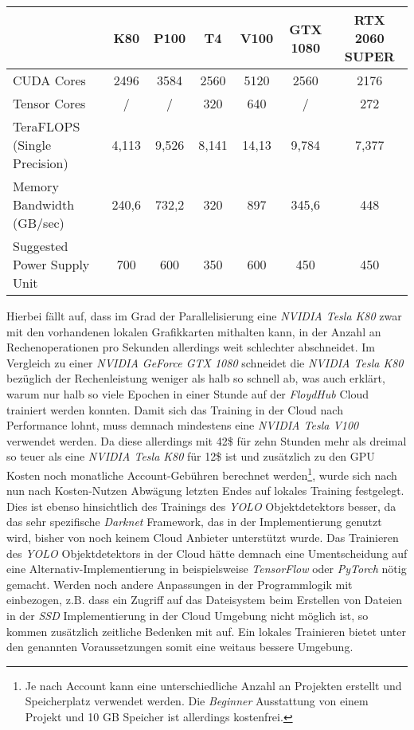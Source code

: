 \begin{center}
	\begin{tabular}[H]{l|c|c|c|c|c|c}
		& K80 & P100 & T4 & V100 & GTX 1080 & RTX 2060 SUPER \\
		\hline
		CUDA Cores & 2496 & 3584 & 2560 & 5120 & 2560 & 2176 \\
		Tensor Cores & / & / & 320 & 640 & / & 272 \\
		TeraFLOPS (Single Precision) & 4,113 & 9,526 & 8,141 & 14,13 & 9,784 & 7,377 \\
		Memory Bandwidth (GB/sec) & 240,6 & 732,2 & 320 & 897 & 345,6 & 448 \\
		Suggested Power Supply Unit & 700 & 600 & 350 & 600 & 450 & 450
	\end{tabular}
	\label{table:hardware}
\end{center}

Hierbei fällt auf, dass im Grad der Parallelisierung eine \textit{NVIDIA Tesla K80} zwar mit den vorhandenen lokalen Grafikkarten mithalten kann, in der Anzahl an Rechenoperationen pro Sekunden allerdings weit schlechter abschneidet. Im Vergleich zu einer \textit{NVIDIA GeForce GTX 1080} schneidet die \textit{NVIDIA Tesla K80} bezüglich der Rechenleistung weniger als halb so schnell ab, was auch erklärt, warum nur halb so viele Epochen in einer Stunde auf der \textit{FloydHub} Cloud trainiert werden konnten. Damit sich das Training in der Cloud nach Performance lohnt, muss demnach mindestens eine \textit{NVIDIA Tesla V100} verwendet werden. Da diese allerdings mit 42\$ für zehn Stunden mehr als dreimal so teuer als eine \textit{NVIDIA Tesla K80} für 12\$ ist und zusätzlich zu den GPU Kosten noch monatliche Account-Gebühren berechnet werden\footnote{Je nach Account kann eine unterschiedliche Anzahl an Projekten erstellt und Speicherplatz verwendet werden. Die \textit{Beginner} Ausstattung von einem Projekt und 10 GB Speicher ist allerdings kostenfrei.}, wurde sich nach nun nach Kosten-Nutzen Abwägung letzten Endes auf lokales Training festgelegt. Dies ist ebenso hinsichtlich des Trainings des \textit{YOLO} Objektdetektors besser, da das sehr spezifische \textit{Darknet} Framework, das in der Implementierung genutzt wird, bisher von noch keinem Cloud Anbieter unterstützt wurde. Das Trainieren des \textit{YOLO} Objektdetektors in der Cloud hätte demnach eine Umentscheidung auf eine Alternativ-Implementierung in beispielsweise \textit{TensorFlow} oder \textit{PyTorch} nötig gemacht. Werden noch andere Anpassungen in der Programmlogik mit einbezogen, z.B. dass ein Zugriff auf das Dateisystem beim Erstellen von Dateien in der \textit{SSD} Implementierung in der Cloud Umgebung nicht möglich ist, so kommen zusätzlich zeitliche Bedenken mit auf. Ein lokales Trainieren bietet unter den genannten Voraussetzungen somit eine weitaus bessere Umgebung.


